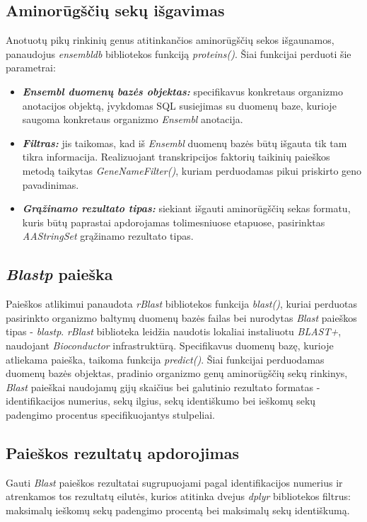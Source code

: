 \documentclass[12pt]{article}
\begin{document}
\subsection{Aminorūgščių sekų išgavimas}
Anotuotų pikų rinkinių genus atitinkančios aminorūgščių sekos išgaunamos,
panaudojus \emph{ensembldb}\cite{ENSEMBLDB} bibliotekos funkciją 
\emph{proteins()}. Šiai funkcijai perduoti šie parametrai:

\begin{itemize}
    \item \textbf{\emph{Ensembl duomenų bazės objektas:}} specifikavus
        konkretaus organizmo anotacijos objektą, įvykdomas SQL susiejimas su
        duomenų baze, kurioje saugoma konkretaus organizmo \emph{Ensembl}
        anotacija.
    \item \textbf{\emph{Filtras:}} jis taikomas, kad iš \emph{Ensembl} duomenų
        bazės būtų išgauta tik tam tikra informacija. Realizuojant
        transkripcijos faktorių taikinių paieškos metodą taikytas
        \emph{GeneNameFilter()}, kuriam perduodamas pikui priskirto geno
        pavadinimas.
    \item \textbf{\emph{Grąžinamo rezultato tipas:}} siekiant išgauti
        aminorūgščių sekas formatu, kuris būtų paprastai apdorojamas
        tolimesniuose etapuose, pasirinktas \emph{AAStringSet} grąžinamo
        rezultato tipas.
\end{itemize}

\subsection{\emph{Blastp} paieška}
Paieškos atlikimui panaudota \emph{rBlast}\cite{RBLAST} bibliotekos funkcija
\emph{blast()}, kuriai perduotas pasirinkto organizmo baltymų duomenų bazės
failas bei nurodytas \emph{Blast} paieškos tipas - \emph{blastp}.
\emph{rBlast} biblioteka leidžia naudotis lokaliai instaliuotu
\emph{BLAST+}\cite{BLAST}, naudojant \emph{Bioconductor} in\-fra\-struk\-tū\-rą.
Specifikavus duomenų bazę, kurioje atliekama paieška, taikoma funkcija
\emph{predict()}. Šiai funkcijai perduodamas duomenų bazės objektas, pradinio
organizmo genų aminorūgščių sekų rinkinys, \emph{Blast} paieškai naudojamų gijų
skaičius bei galutinio rezultato formatas - identifikacijos numerius, sekų
ilgius, sekų identiškumo bei ieškomų sekų padengimo procentus specifikuojantys
stulpeliai.

\subsection{Paieškos rezultatų apdorojimas}
Gauti \emph{Blast} paieškos rezultatai sugrupuojami pagal identifikacijos
numerius ir atrenkamos tos rezultatų eilutės, kurios atitinka dvejus \emph{dplyr}
bibliotekos filtrus: maksimalų ieškomų sekų padengimo procentą bei maksimalų
sekų identiškumą.
\end{document}
